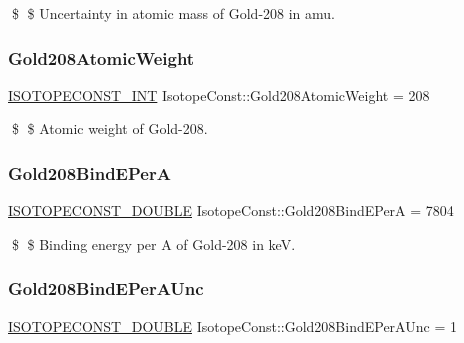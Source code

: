 \$ \$ Uncertainty in atomic mass of Gold-\/208 in amu. \mbox{\label{group___isotope_const-_gold-_au208_gacdef666e0c3a27d7e9d90907f895db19}} 
\subsubsection{\texorpdfstring{Gold208\+Atomic\+Weight}{Gold208AtomicWeight}}
{\footnotesize\ttfamily \mbox{\hyperlink{group___isotope_const-_macros_ga5f18360b3e99483a35c32d789e62621c}{I\+S\+O\+T\+O\+P\+E\+C\+O\+N\+S\+T\+\_\+\+I\+NT}} Isotope\+Const\+::\+Gold208\+Atomic\+Weight = 208}

\$ \$ Atomic weight of Gold-\/208. \mbox{\label{group___isotope_const-_gold-_au208_gacdf9fc2e129c43abfea480f6d96dcf16}} 
\subsubsection{\texorpdfstring{Gold208\+Bind\+E\+PerA}{Gold208BindEPerA}}
{\footnotesize\ttfamily \mbox{\hyperlink{group___isotope_const-_macros_ga8f45a7272ce02c0b4c65c44636ed719a}{I\+S\+O\+T\+O\+P\+E\+C\+O\+N\+S\+T\+\_\+\+D\+O\+U\+B\+LE}} Isotope\+Const\+::\+Gold208\+Bind\+E\+PerA = 7804}

\$ \$ Binding energy per A of Gold-\/208 in keV. \mbox{\label{group___isotope_const-_gold-_au208_gac6a9426483b9779a3491129c9b1e74b2}} 
\subsubsection{\texorpdfstring{Gold208\+Bind\+E\+Per\+A\+Unc}{Gold208BindEPerAUnc}}
{\footnotesize\ttfamily \mbox{\hyperlink{group___isotope_const-_macros_ga8f45a7272ce02c0b4c65c44636ed719a}{I\+S\+O\+T\+O\+P\+E\+C\+O\+N\+S\+T\+\_\+\+D\+O\+U\+B\+LE}} Isotope\+Const\+::\+Gold208\+Bind\+E\+Per\+A\+Unc = 1}

